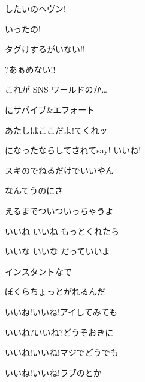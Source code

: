 \documentclass[a4paper,tate,twocolumn,12pt]{ltjtarticle}
\begin{document}
\begin{flushleft}
\begin{minipage}{\linewidth}
したいのヘヴン!

いったの!
\end{minipage}

\vspace{2em}

\noindent\begin{minipage}{\linewidth}
タグけするがいない!!

?あぁめない!!

これが SNS ワールドのか…

にサバイブ\&エフォート

あたしはここだよ!てくれッ

になったならしてされてsay! いいね!
\end{minipage}

\vspace{2em}

\noindent\begin{minipage}{\linewidth}
スキのでねるだけでいいやん

なんてうのにさ

えるまでついついっちゃうよ
\end{minipage}

\vspace{2em}

\noindent\begin{minipage}{\linewidth}
いいね いいね もっとくれたら

いいな いいな だっていいよ

インスタントなで

ぼくらちょっとがれるんだ
\end{minipage}

\vspace{2em}

\noindent\begin{minipage}{\linewidth}
いいね!いいね!アイしてみても

いいね?いいね?どうぞおきに

いいね!いいね!マジでどうでも

いいね!いいね!ラブのとか
\end{minipage}


\end{flushleft}
\end{document}
